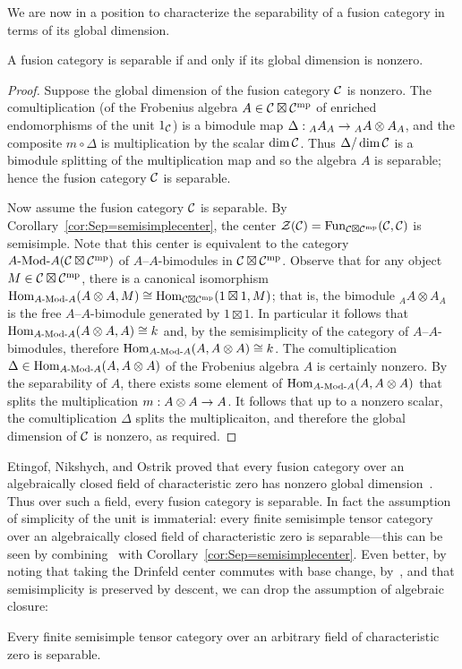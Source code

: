 \documentclass{amsart}
\begin{document}
We are now in a position to characterize the separability of a fusion category in terms of its global dimension.
\begin{theorem} \label{thm:NonzeroDimension}
A fusion category is separable if and only if its global dimension is nonzero.
\end{theorem}
\begin{proof}
Suppose the global dimension of the fusion category $\mathcal C$ is nonzero.  The comultiplication (of the Frobenius algebra $A \in \mathcal C \boxtimes \mathcal C^{\mathrm{mp}}$ of enriched endomorphisms of the unit $1_\mathcal C$) is a bimodule map $\Delta: {}_A A_A \rightarrow {}_A A \otimes A_A$, and the composite $m \circ \Delta$ is multiplication by the scalar $\dim \mathcal C$.  Thus $\Delta / \dim \mathcal C$ is a bimodule splitting of the multiplication map and so the algebra $A$ is separable; hence the fusion category $\mathcal C$ is separable.

Now assume the fusion category $\mathcal C$ is separable.  By Corollary~\ref{cor:Sep=semisimplecenter}, the center $\mathcal Z(\mathcal C) = \operatorname{Fun}_{\mathcal C \boxtimes \mathcal C^{\mathrm{mp}}}(\mathcal C,\mathcal C)$ is semisimple.  Note that this center is equivalent to the category $\Mod{A}{A}(\cC \boxtimes \cC^\mp)$ of $A$--$A$-bimodules in $\mathcal C \boxtimes \mathcal C^{\mathrm{mp}}$.  Observe that for any object $M \in \mathcal C \boxtimes \mathcal C^{\mathrm{mp}}$, there is a canonical isomorphism $\Hom_{\Mod{A}{A}}(A \otimes A,M) \cong \Hom_{\cC \boxtimes \cC^\mp}(1 \boxtimes 1,M)$; that is, the bimodule ${}_A A \otimes A_A$ is the free $A$--$A$-bimodule generated by $1 \boxtimes 1$.  In particular it follows that $\Hom_{\Mod{A}{A}}(A \otimes A, A) \cong k$ and, by the semisimplicity of the category of $A$--$A$-bimodules, therefore $\Hom_{\Mod{A}{A}}(A, A \otimes A) \cong k$.  The comultiplication $\Delta \in \Hom_{\Mod{A}{A}}(A, A \otimes A)$ of the Frobenius algebra $A$ is certainly nonzero.  By the separability of $A$, there exists some element of $\Hom_{\Mod{A}{A}}(A, A \otimes A)$ that splits the multiplication $m: A \otimes A \rightarrow A$.  It follows that up to a nonzero scalar, the comultiplication $\Delta$ splits the multiplicaiton, and therefore the global dimension of $\mathcal C$ is nonzero, as required.
\end{proof}

Etingof, Nikshych, and Ostrik proved that every fusion category over an algebraically closed field of characteristic zero has nonzero global dimension~\cite[Thm. 2.3]{MR2183279}.  Thus over such a field, every fusion category is separable.  In fact the assumption of simplicity of the unit is immaterial: every finite semisimple tensor category over an algebraically closed field of characteristic zero is separable---this can be seen by combining~\cite[Thm 2.18]{MR2183279} with Corollary~\ref{cor:Sep=semisimplecenter}.  Even better, by noting that taking the Drinfeld center commutes with base change, by~\cite[Lemma 5.1]{1002.0168}, and that semisimplicity is preserved by descent, we can drop the assumption of algebraic closure: 
\begin{corollary} \label{cor:charzerosep}
Every finite semisimple tensor category over an arbitrary field of characteristic zero is separable.
\end{corollary}
\end{document}
